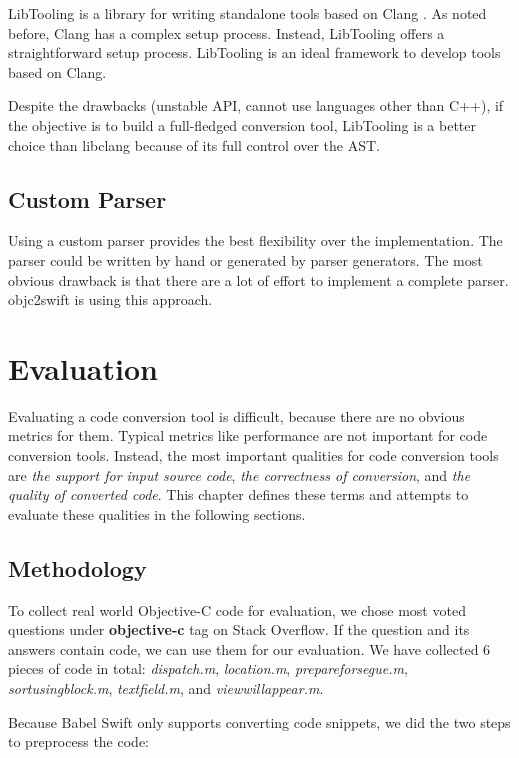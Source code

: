 \documentclass{sfuthesis}
\begin{document}
LibTooling is a library for writing standalone tools based on Clang \cite{libtooling}. As noted before, Clang has a complex setup process. Instead, LibTooling offers a straightforward setup process. LibTooling is an ideal framework to develop tools based on Clang.

Despite the drawbacks (unstable API, cannot use languages other than C++), if the objective is to build a full-fledged conversion tool, LibTooling is a better choice than libclang because of its full control over the AST.

\section{Custom Parser}

Using a custom parser provides the best flexibility over the implementation. The parser could be written by hand or generated by parser generators. The most obvious drawback is that there are a lot of effort to implement a complete parser. objc2swift \cite{objc2swift} is using this approach.

\chapter{Evaluation}

Evaluating a code conversion tool is difficult, because there are no obvious metrics for them. Typical metrics like performance are not important for code conversion tools. Instead, the most important qualities for code conversion tools are \emph{the support for input source code}, \emph{the correctness of conversion}, and \emph{the quality of converted code}. This chapter defines these terms and attempts to evaluate these qualities in the following sections.

\section{Methodology}

To collect real world Objective-C code for evaluation, we chose most voted questions under \textbf{objective-c} tag on Stack Overflow. If the question and its answers contain code, we can use them for our evaluation. We have collected 6 pieces of code in total: \emph{dispatch.m}, \emph{location.m}, \emph{prepareforsegue.m}, \emph{sortusingblock.m}, \emph{textfield.m}, and \emph{viewwillappear.m}.

Because Babel Swift only supports converting code snippets, we did the two steps to preprocess the code:
\end{document}
